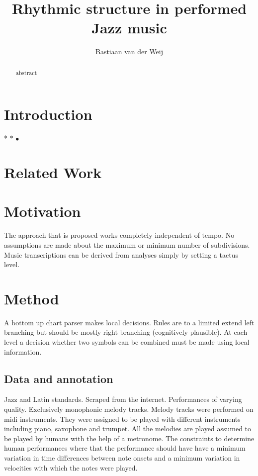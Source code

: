 \documentclass[a4paper,10pt]{article}
\title{Rhythmic structure in performed Jazz music}
\author{Bastiaan van der Weij}
\begin{document}
\maketitle
\begin{abstract}
abstract
\end{abstract}
\section{Introduction}
\label{sec:introduction}
* $*$  $\bullet$
\section{Related Work}
\label{sec:relatedwork}

\section{Motivation}
\label{sec:motivation}

The approach that is proposed works completely independent of tempo. No assumptions are made about the maximum or minimum number of subdivisions. Music transcriptions can be derived from analyses simply by setting a tactus level.

\section{Method}
\label{sec:method}

A bottom up chart parser makes local decisions. Rules are to a limited extend left branching but should be mostly right branching (cognitively plausible). At each level a decision whether two symbols can be combined must be made using local information.

\subsection{Data and annotation}

Jazz and Latin standards. Scraped from the internet. Performances of varying quality. Exclusively monophonic melody tracks. Melody tracks were performed on midi instruments. They were assigned to be played with different instruments including piano, saxophone and trumpet. All the melodies are played assumed to be played by humans with the help of a metronome. The constraints to determine human performances where that the performance should have have a minimum variation in time differences between note onsets and a minimum variation in velocities with which the notes were played.
\end{document}
